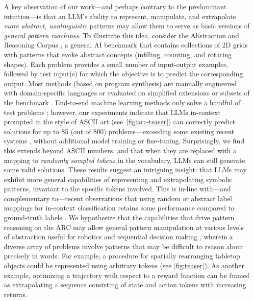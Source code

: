 A key observation of our work---and perhaps contrary to the predominant intuition---is that an LLM's ability to represent, manipulate, and extrapolate \textit{more abstract, nonlinguistic} patterns may allow them to serve as basic versions of \textit{general pattern machines}. To illustrate this idea, consider the Abstraction and Reasoning Corpus \cite{chollet2019measure}, a general AI benchmark that contains collections of 2D grids with patterns that evoke abstract concepts (\eg infilling, counting, and rotating shapes). Each problem provides a small number of input-output examples, followed by test input(s) for which the objective is to predict the corresponding output. Most methods (based on program synthesis) are manually engineered with domain-specific languages \cite{ferre2021first,xu2022graphs,ainooson2023approach,alford2021neurosymbolic} or evaluated on simplified extensions or subsets of the benchmark \cite{assouel2022object,moskvichev2023conceptarc,kolev2020neural}. End-to-end machine learning methods only solve a handful of test problems \cite{paparaju2020arc}; however, our experiments indicate that LLMs in-context prompted in the style of ASCII art (see~\cref{fig:arc-teaser}) can correctly predict solutions for up to 85 (out of 800) problems---exceeding some existing recent systems \cite{ferre2021first,xu2022graphs,alford2021neurosymbolic}, without additional model training or fine-tuning. Surprisingly, we find this extends beyond ASCII numbers, and that when they are replaced with a mapping to \textit{randomly sampled tokens} in the vocabulary, LLMs can still generate some valid solutions. These results suggest an intriguing insight: that LLMs may exhibit more general capabilities of representing and extrapolating symbolic patterns, invariant to the specific tokens involved.
This is in-line with---and complementary to---recent observations that using random or abstract label mappings for in-context classification retains some performance compared to ground-truth labels \cite{min2022rethinking, pan2023context}.
We hypothesize that the capabilities that drive pattern reasoning on the ARC may allow general pattern manipulation at various levels of abstraction useful for robotics and sequential decision making \cite{lu2021pretrained,reid2022can}, wherein a diverse array of problems involve patterns that may be difficult to reason about precisely in words. For example, a procedure for spatially rearranging tabletop objects could be represented using arbitrary tokens (see \cref{fig:teaser}). As another example, optimizing a trajectory with respect to a reward function can be framed as extrapolating a sequence consisting of state and action tokens with increasing returns.

